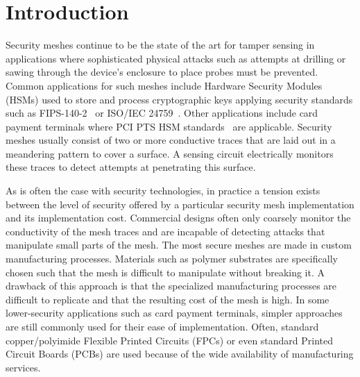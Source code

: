 \documentclass[final]{iacrtrans}
\begin{document}
\section{Introduction}

%
%



Security meshes continue to be the state of the art for tamper sensing in applications where sophisticated physical
attacks such as attempts at drilling or sawing through the device's enclosure to place probes must be prevented. Common
applications for such meshes include Hardware Security Modules (HSMs) used to store and process cryptographic keys
applying security standards such as
FIPS-140-2~\cite{usnationalinstituteofstandardsandtechnologySecurityRequirementsCryptographic2002} or ISO/IEC
24759~\cite{ISOIEC24759}. Other applications include card payment terminals where PCI PTS HSM
standards~\cite{pcisecuritystandardscouncilPaymentCardIndustry2021} are applicable. Security meshes usually consist of
two or more conductive traces that are laid out in a meandering pattern to cover a surface. A sensing circuit
electrically monitors these traces to detect attempts at penetrating this surface.

As is often the case with security technologies, in practice a tension exists between the level of security offered by a
particular security mesh implementation and its implementation cost. Commercial designs often only coarsely monitor the
conductivity of the mesh traces and are incapable of detecting attacks that manipulate small parts of the mesh. The most
secure meshes are made in custom manufacturing processes. Materials such as polymer substrates are specifically chosen
such that the mesh is difficult to manipulate without breaking it. A drawback of this approach is that the specialized
manufacturing processes are difficult to replicate and that the resulting cost of the mesh is high. In some
lower-security applications such as card payment terminals, simpler approaches are still commonly used for their ease of
implementation. Often, standard copper/polyimide Flexible Printed Circuits (FPCs) or even standard Printed Circuit
Boards (PCBs) are used because of the wide availability of manufacturing services.
\end{document}
